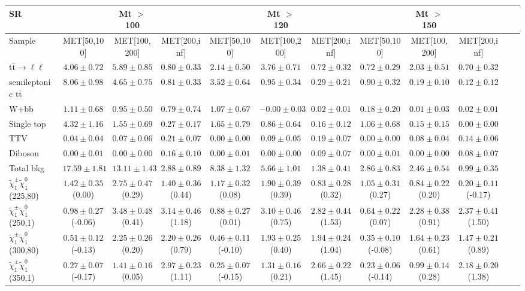 \begin{table}
\begin{center}
\small
\begin{tabular}{lccccccccccc}
\hline
SR & & Mt $>$ 100 & & & Mt $>$ 120 & & &Mt $>$ 150 & & &\\
\hline
Sample&MET[50,100]&MET[100,200]&MET[200,inf]&MET[50,100]&MET[100,200]&MET[200,inf]&MET[50,100]&MET[100,200]&MET[200,inf]&\\
\hline
$\mathrm{t}\bar{\mathrm{t}}\rightarrow \ell\ell$&$4.06\pm0.72$&$5.89\pm0.85$&$0.80\pm0.33$&$2.14\pm0.50$&$3.76\pm0.71$&$0.72\pm0.32$&$0.72\pm0.29$&$2.03\pm0.51$&$0.70\pm0.32$\\
semileptonic $\mathrm{t}\bar{\mathrm{t}}$&$8.06\pm0.98$&$4.65\pm0.75$&$0.81\pm0.33$&$3.52\pm0.64$&$0.95\pm0.34$&$0.29\pm0.21$&$0.90\pm0.32$&$0.19\pm0.10$&$0.12\pm0.12$\\
W+bb&$1.11\pm0.68$&$0.95\pm0.50$&$0.79\pm0.74$&$1.07\pm0.67$&$-0.00\pm0.03$&$0.02\pm0.01$&$0.18\pm0.20$&$0.01\pm0.03$&$0.02\pm0.01$\\
Single top&$4.32\pm1.16$&$1.55\pm0.69$&$0.27\pm0.17$&$1.65\pm0.79$&$0.86\pm0.64$&$0.16\pm0.12$&$1.06\pm0.68$&$0.15\pm0.15$&$0.00\pm0.00$\\
TTV&$0.04\pm0.04$&$0.07\pm0.06$&$0.21\pm0.07$&$0.00\pm0.00$&$0.09\pm0.05$&$0.19\pm0.07$&$0.00\pm0.00$&$0.08\pm0.04$&$0.14\pm0.06$\\
Diboson&$0.00\pm0.01$&$0.00\pm0.00$&$0.16\pm0.10$&$0.00\pm0.01$&$0.00\pm0.00$&$0.09\pm0.07$&$0.00\pm0.01$&$0.00\pm0.00$&$0.08\pm0.07$\\
\hline
Total bkg&$17.59\pm1.81$&$13.11\pm1.43$&$2.88\pm0.89$&$8.38\pm1.32$&$5.66\pm1.01$&$1.38\pm0.41$&$2.86\pm0.83$&$2.46\pm0.54$&$0.99\pm0.35$\\
$\tilde{\chi}_{1}^{\pm}\tilde{\chi}_{1}^{0}$ (225,80)&$1.42\pm0.35$(0.00)&$2.75\pm0.47$(0.29)&$1.40\pm0.36$(0.44)&$1.17\pm0.32$(0.08)&$1.90\pm0.39$(0.39)&$0.83\pm0.28$(0.32)&$1.05\pm0.31$(0.27)&$0.84\pm0.22$(0.20)&$0.20\pm0.11$(-0.17)\\
$\tilde{\chi}_{1}^{\pm}\tilde{\chi}_{1}^{0}$ (250,1)&$0.98\pm0.27$(-0.06)&$3.48\pm0.48$(0.41)&$3.14\pm0.46$(1.18)&$0.88\pm0.27$(0.01)&$3.10\pm0.46$(0.75)&$2.82\pm0.44$(1.53)&$0.64\pm0.22$(0.07)&$2.28\pm0.38$(0.91)&$2.37\pm0.41$(1.50)\\
$\tilde{\chi}_{1}^{\pm}\tilde{\chi}_{1}^{0}$ (300,80)&$0.51\pm0.12$(-0.13)&$2.25\pm0.26$(0.20)&$2.20\pm0.26$(0.79)&$0.46\pm0.11$(-0.10)&$1.93\pm0.25$(0.40)&$1.94\pm0.24$(1.04)&$0.35\pm0.10$(-0.08)&$1.64\pm0.23$(0.61)&$1.47\pm0.21$(0.89)\\
$\tilde{\chi}_{1}^{\pm}\tilde{\chi}_{1}^{0}$ (350,1)&$0.27\pm0.07$(-0.17)&$1.41\pm0.16$(0.05)&$2.97\pm0.23$(1.11)&$0.25\pm0.07$(-0.15)&$1.31\pm0.16$(0.21)&$2.66\pm0.22$(1.45)&$0.23\pm0.06$(-0.14)&$0.99\pm0.14$(0.28)&$2.18\pm0.20$(1.38)\\
\hline
\hline\hline
\end{tabular}
\end{center}
\end{table}
